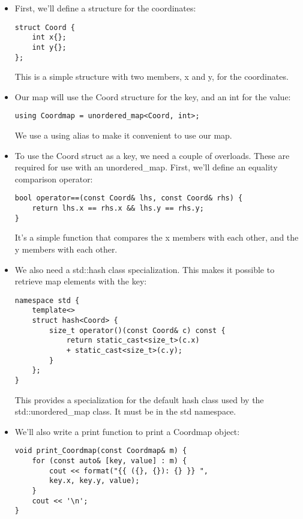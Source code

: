 \begin{itemize}
\item 
First, we'll define a structure for the coordinates:

\begin{lstlisting}[style=styleCXX]
struct Coord {
	int x{};
	int y{};
};
\end{lstlisting}

This is a simple structure with two members, x and y, for the coordinates.

\item 
Our map will use the Coord structure for the key, and an int for the value:

\begin{lstlisting}[style=styleCXX]
using Coordmap = unordered_map<Coord, int>;
\end{lstlisting}

We use a using alias to make it convenient to use our map.

\item 
To use the Coord struct as a key, we need a couple of overloads. These are required for use with an unordered\_map. First, we'll define an equality comparison operator:

\begin{lstlisting}[style=styleCXX]
bool operator==(const Coord& lhs, const Coord& rhs) {
	return lhs.x == rhs.x && lhs.y == rhs.y;
}
\end{lstlisting}

It's a simple function that compares the x members with each other, and the y members with each other.

\item 
We also need a std::hash class specialization. This makes it possible to retrieve map elements with the key:

\begin{lstlisting}[style=styleCXX]
namespace std {
	template<>
	struct hash<Coord> {
		size_t operator()(const Coord& c) const {
			return static_cast<size_t>(c.x)
			+ static_cast<size_t>(c.y);
		}
	};
}
\end{lstlisting}

This provides a specialization for the default hash class used by the std::unordered\_map class. It must be in the std namespace.

\item 
We'll also write a print function to print a Coordmap object:

\begin{lstlisting}[style=styleCXX]
void print_Coordmap(const Coordmap& m) {
	for (const auto& [key, value] : m) {
		cout << format("{{ ({}, {}): {} }} ",
		key.x, key.y, value);
	}
	cout << '\n';
}
\end{lstlisting}


\end{itemize}
